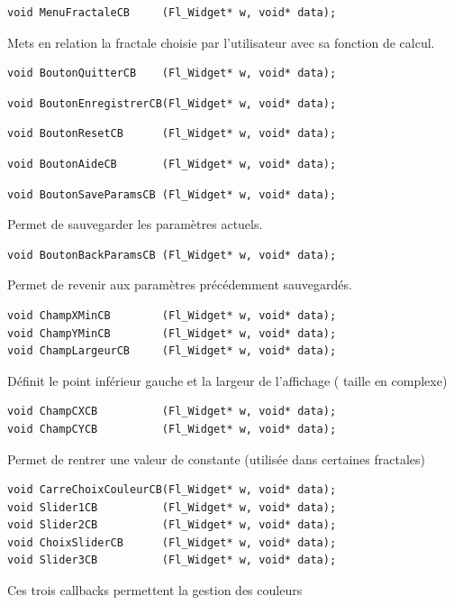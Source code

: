 \documentclass[a4paper,11pt]{article} \usepackage[T1]{fontenc} \usepackage[utf8]{inputenc} \usepackage[francais]{babel}
\begin{document}
\begin{lstlisting}
void MenuFractaleCB     (Fl_Widget* w, void* data);\end{lstlisting}
Mets en relation la fractale choisie par l'utilisateur avec sa fonction de calcul.
\begin{lstlisting}
void BoutonQuitterCB    (Fl_Widget* w, void* data);\end{lstlisting}

\begin{lstlisting}
void BoutonEnregistrerCB(Fl_Widget* w, void* data);\end{lstlisting}

\begin{lstlisting}
void BoutonResetCB      (Fl_Widget* w, void* data);\end{lstlisting}

\begin{lstlisting}
void BoutonAideCB       (Fl_Widget* w, void* data);\end{lstlisting}

\begin{lstlisting}
void BoutonSaveParamsCB (Fl_Widget* w, void* data);\end{lstlisting}
Permet de sauvegarder les paramètres actuels.
\begin{lstlisting}
void BoutonBackParamsCB (Fl_Widget* w, void* data);\end{lstlisting}
Permet de revenir aux paramètres précédemment sauvegardés.

\begin{lstlisting}
void ChampXMinCB        (Fl_Widget* w, void* data);
void ChampYMinCB        (Fl_Widget* w, void* data);
void ChampLargeurCB     (Fl_Widget* w, void* data);\end{lstlisting}
Définit le point inférieur gauche et la largeur de l'affichage ( taille en complexe)

\begin{lstlisting}
void ChampCXCB          (Fl_Widget* w, void* data);
void ChampCYCB          (Fl_Widget* w, void* data);\end{lstlisting}
Permet de rentrer une valeur de constante (utilisée dans certaines fractales)

\begin{lstlisting}
void CarreChoixCouleurCB(Fl_Widget* w, void* data);
void Slider1CB          (Fl_Widget* w, void* data);
void Slider2CB          (Fl_Widget* w, void* data);
void ChoixSliderCB		(Fl_Widget* w, void* data);
void Slider3CB          (Fl_Widget* w, void* data);\end{lstlisting}
Ces trois callbacks permettent la gestion des couleurs
\end{document}
